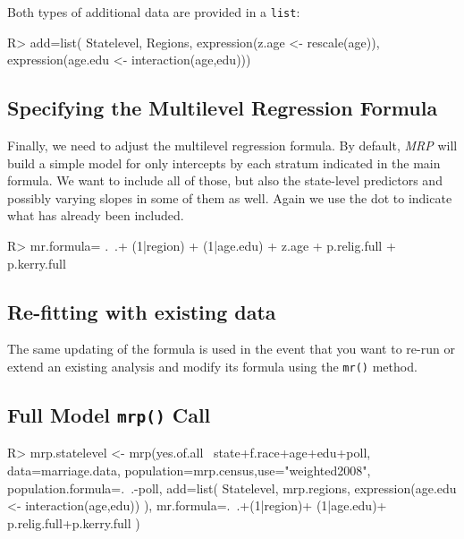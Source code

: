\documentclass[11pt]{article} %
\begin{document}
Both types of additional data are provided in a \texttt{list}:
\begin{Schunk}
\begin{Sinput}
R> add=list(
     Statelevel,
     Regions,
     expression(z.age <- rescale(age)),
     expression(age.edu <- interaction(age,edu)))
\end{Sinput}
\end{Schunk}

\subsection{Specifying the Multilevel Regression Formula}
\label{sec:spec-mult-regr}

Finally, we need to adjust the multilevel regression formula. By default, \emph{MRP} will build a simple model for only intercepts by each stratum indicated in the main formula. We want to include all of those, but also the state-level predictors and possibly varying slopes in some of them as well. Again we use the dot to indicate what has already been included.

\begin{Schunk}
\begin{Sinput}
R> mr.formula= .~.+ (1|region) + (1|age.edu) + z.age + p.relig.full + p.kerry.full
\end{Sinput}
\end{Schunk}

\subsection{Re-fitting with existing data}
\label{sec:re-fitting-with}

The same updating of the formula is used in the event that you want to re-run or extend an existing analysis and modify its formula using the \texttt{mr()} method.

\subsection{Full Model \texttt{mrp()} Call}
\label{sec:full-model-call}

\begin{Schunk}
\begin{Sinput}
R> mrp.statelevel <- mrp(yes.of.all~
                         state+f.race+age+edu+poll,
                         data=marriage.data,
                         population=mrp.census,use="weighted2008",
                         population.formula=.~.-poll,
                         add=list(
                           Statelevel,
                           mrp.regions,
                           expression(age.edu <- interaction(age,edu))
                           ),
                         mr.formula=.~.+(1|region)+ (1|age.edu)+
                          p.relig.full+p.kerry.full
                         )
\end{Sinput}
\end{Schunk}
\end{document}
